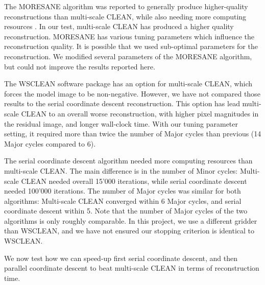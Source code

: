 The MORESANE algorithm was reported to generally produce higher-quality reconstructions than multi-scale CLEAN, while also needing more computing resources \cite{dabbech2015moresane, offringa2017optimized}. In our test, multi-scale CLEAN has produced a higher quality reconstruction. MORESANE has various tuning parameters which influence the reconstruction quality. It is possible that we used sub-optimal parameters for the reconstruction. We modified several parameters of the MORESANE algorithm, but could not improve the results reported here.

The WSCLEAN software package has an option for multi-scale CLEAN, which forces the model image to be non-negative. However, we have not compared those results to the serial coordinate descent reconstruction. This option has lead multi-scale CLEAN to an overall worse reconstruction, with higher pixel magnitudes in the residual image, and longer wall-clock time. With our tuning parameter setting, it required more than twice the number of Major cycles than previous (14 Major cycles compared to 6).

The serial coordinate descent algorithm needed more computing resources than multi-scale CLEAN. The main difference is in the number of Minor cycles: Multi-scale CLEAN needed overall 15'000 iterations, while serial coordinate descent needed 100'000 iterations. The number of Major cycles was similar for both algorithms: Multi-scale CLEAN converged within 6 Major cycles, and serial coordinate descent within 5. Note that the number of Major cycles of the two algorithms is only roughly comparable. In this project, we use a different gridder than WSCLEAN, and we have not ensured our stopping criterion is identical to WSCLEAN. 

We now test how we can speed-up first serial coordinate descent, and then parallel coordinate descent to beat multi-scale CLEAN in terms of reconstruction time.


